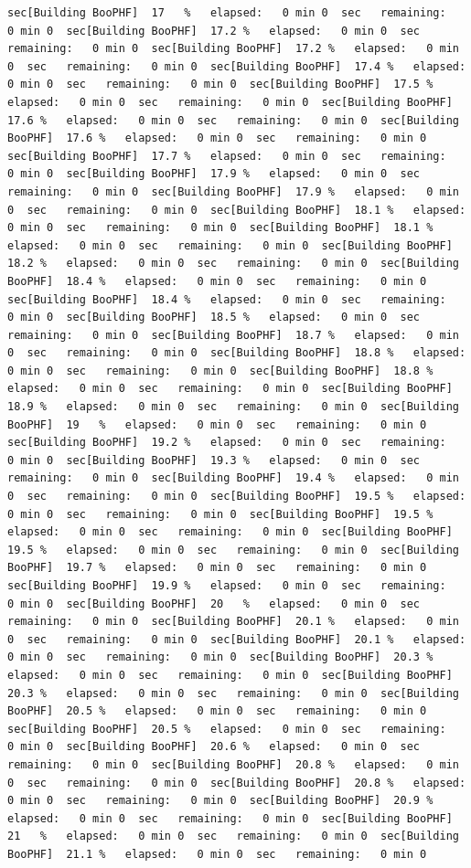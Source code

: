\documentclass[
]{book}
\begin{document}
\begin{verbatim}
sec[Building BooPHF]  17   %   elapsed:   0 min 0  sec   remaining:   0 min 0  sec[Building BooPHF]  17.2 %   elapsed:   0 min 0  sec   remaining:   0 min 0  sec[Building BooPHF]  17.2 %   elapsed:   0 min 0  sec   remaining:   0 min 0  sec[Building BooPHF]  17.4 %   elapsed:   0 min 0  sec   remaining:   0 min 0  sec[Building BooPHF]  17.5 %   elapsed:   0 min 0  sec   remaining:   0 min 0  sec[Building BooPHF]  17.6 %   elapsed:   0 min 0  sec   remaining:   0 min 0  sec[Building BooPHF]  17.6 %   elapsed:   0 min 0  sec   remaining:   0 min 0  sec[Building BooPHF]  17.7 %   elapsed:   0 min 0  sec   remaining:   0 min 0  sec[Building BooPHF]  17.9 %   elapsed:   0 min 0  sec   remaining:   0 min 0  sec[Building BooPHF]  17.9 %   elapsed:   0 min 0  sec   remaining:   0 min 0  sec[Building BooPHF]  18.1 %   elapsed:   0 min 0  sec   remaining:   0 min 0  sec[Building BooPHF]  18.1 %   elapsed:   0 min 0  sec   remaining:   0 min 0  sec[Building BooPHF]  18.2 %   elapsed:   0 min 0  sec   remaining:   0 min 0  sec[Building BooPHF]  18.4 %   elapsed:   0 min 0  sec   remaining:   0 min 0  sec[Building BooPHF]  18.4 %   elapsed:   0 min 0  sec   remaining:   0 min 0  sec[Building BooPHF]  18.5 %   elapsed:   0 min 0  sec   remaining:   0 min 0  sec[Building BooPHF]  18.7 %   elapsed:   0 min 0  sec   remaining:   0 min 0  sec[Building BooPHF]  18.8 %   elapsed:   0 min 0  sec   remaining:   0 min 0  sec[Building BooPHF]  18.8 %   elapsed:   0 min 0  sec   remaining:   0 min 0  sec[Building BooPHF]  18.9 %   elapsed:   0 min 0  sec   remaining:   0 min 0  sec[Building BooPHF]  19   %   elapsed:   0 min 0  sec   remaining:   0 min 0  sec[Building BooPHF]  19.2 %   elapsed:   0 min 0  sec   remaining:   0 min 0  sec[Building BooPHF]  19.3 %   elapsed:   0 min 0  sec   remaining:   0 min 0  sec[Building BooPHF]  19.4 %   elapsed:   0 min 0  sec   remaining:   0 min 0  sec[Building BooPHF]  19.5 %   elapsed:   0 min 0  sec   remaining:   0 min 0  sec[Building BooPHF]  19.5 %   elapsed:   0 min 0  sec   remaining:   0 min 0  sec[Building BooPHF]  19.5 %   elapsed:   0 min 0  sec   remaining:   0 min 0  sec[Building BooPHF]  19.7 %   elapsed:   0 min 0  sec   remaining:   0 min 0  sec[Building BooPHF]  19.9 %   elapsed:   0 min 0  sec   remaining:   0 min 0  sec[Building BooPHF]  20   %   elapsed:   0 min 0  sec   remaining:   0 min 0  sec[Building BooPHF]  20.1 %   elapsed:   0 min 0  sec   remaining:   0 min 0  sec[Building BooPHF]  20.1 %   elapsed:   0 min 0  sec   remaining:   0 min 0  sec[Building BooPHF]  20.3 %   elapsed:   0 min 0  sec   remaining:   0 min 0  sec[Building BooPHF]  20.3 %   elapsed:   0 min 0  sec   remaining:   0 min 0  sec[Building BooPHF]  20.5 %   elapsed:   0 min 0  sec   remaining:   0 min 0  sec[Building BooPHF]  20.5 %   elapsed:   0 min 0  sec   remaining:   0 min 0  sec[Building BooPHF]  20.6 %   elapsed:   0 min 0  sec   remaining:   0 min 0  sec[Building BooPHF]  20.8 %   elapsed:   0 min 0  sec   remaining:   0 min 0  sec[Building BooPHF]  20.8 %   elapsed:   0 min 0  sec   remaining:   0 min 0  sec[Building BooPHF]  20.9 %   elapsed:   0 min 0  sec   remaining:   0 min 0  sec[Building BooPHF]  21   %   elapsed:   0 min 0  sec   remaining:   0 min 0  sec[Building BooPHF]  21.1 %   elapsed:   0 min 0  sec   remaining:   0 min 0  
\end{verbatim}
\end{document}

